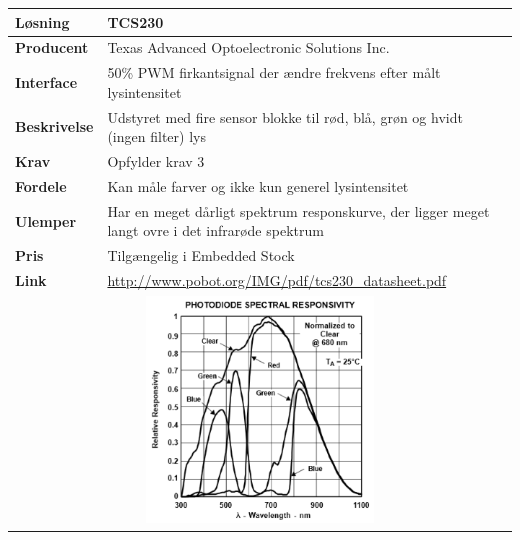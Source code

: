 \begin{table}[H] \centering
\begin{tabular}{|p{3cm}|p{11cm}|}
	\hline
	\textbf{Løsning}		
	    & TCS230 \\ \hline
	\textbf{Producent} 		
    	& Texas Advanced Optoelectronic Solutions Inc. 
    \\ \hline
	\textbf{Interface} 		
    	& 50\% PWM firkantsignal der ændre frekvens efter målt lysintensitet 
    \\ \hline
	\textbf{Beskrivelse} 	
    	& Udstyret med fire sensor blokke til rød, blå, grøn og hvidt (ingen filter) lys 
    \\ \hline
	\textbf{Krav} 			
    	& Opfylder krav 3 
    \\ \hline
	\textbf{Fordele}		
    	& Kan måle farver og ikke kun generel lysintensitet 
    \\ \hline
	\textbf{Ulemper} 		
	    & Har en meget dårligt spektrum responskurve, der ligger meget langt ovre i det infrarøde spektrum 
	\\ \hline
	\textbf{Pris} 			
	    & Tilgængelig i Embedded Stock 
	\\ \hline
	\textbf{Link} 			
	    & \url{http://www.pobot.org/IMG/pdf/tcs230_datasheet.pdf}
	\\ \hline
	\multicolumn{2}{|c|}{\includegraphics[height=6cm]{0_Filer/Figuer/Forudundersoegelse/TCS230.png}} 	
    \\ \hline
\end{tabular}
\end{table}

